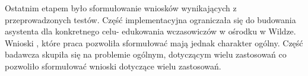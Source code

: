 Ostatnim etapem było sformułowanie wniosków wynikających z przeprowadzonych testów. Część implementacyjna ograniczała się do budowania asystenta dla konkretnego celu- edukowania wczasowiczów w ośrodku w Wildze. Wnioski , które praca pozwoliła sformułować mają jednak charakter ogólny. Część badawcza skupiła się na problemie ogólnym, dotyczącym wielu zastosowań co pozwoliło sformułować wnioski dotyczące wielu zastosowań.